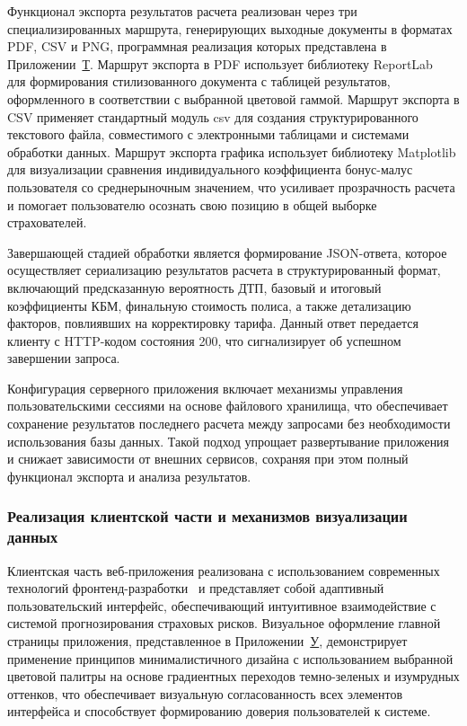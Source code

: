Функционал экспорта результатов расчета реализован через три специализированных маршрута, генерирующих выходные документы в форматах PDF, CSV и PNG, программная реализация которых представлена в Приложении~\hyperref[app:export]{Т}. Маршрут экспорта в PDF использует библиотеку ReportLab~\cite{reportlab2026docs} для формирования стилизованного документа с таблицей результатов, оформленного в соответствии с выбранной цветовой гаммой. Маршрут экспорта в CSV применяет стандартный модуль csv для создания структурированного текстового файла, совместимого с электронными таблицами и системами обработки данных. Маршрут экспорта графика использует библиотеку Matplotlib для визуализации сравнения индивидуального коэффициента бонус-малус пользователя со среднерыночным значением, что усиливает прозрачность расчета и помогает пользователю осознать свою позицию в общей выборке страхователей.

Завершающей стадией обработки является формирование JSON-ответа, которое осуществляет сериализацию результатов расчета в структурированный формат, включающий предсказанную вероятность ДТП, базовый и итоговый коэффициенты КБМ, финальную стоимость полиса, а также детализацию факторов, повлиявших на корректировку тарифа. Данный ответ передается клиенту с HTTP-кодом состояния 200, что сигнализирует об успешном завершении запроса.

Конфигурация серверного приложения включает механизмы управления пользовательскими сессиями на основе файлового хранилища, что обеспечивает сохранение результатов последнего расчета между запросами без необходимости использования базы данных. Такой подход упрощает развертывание приложения и снижает зависимости от внешних сервисов, сохраняя при этом полный функционал экспорта и анализа результатов.

\subsubsection{Реализация клиентской части и механизмов визуализации данных}

Клиентская часть веб-приложения реализована с использованием современных технологий фронтенд-разработки~\cite{html2026mdn, css2026mdn} и представляет собой адаптивный пользовательский интерфейс, обеспечивающий интуитивное взаимодействие с системой прогнозирования страховых рисков. Визуальное оформление главной страницы приложения, представленное в Приложении~\hyperref[app:ui_styles]{У}, демонстрирует применение принципов минималистичного дизайна с использованием выбранной цветовой палитры на основе градиентных переходов темно-зеленых и изумрудных оттенков, что обеспечивает визуальную согласованность всех элементов интерфейса и способствует формированию доверия пользователей к системе.

